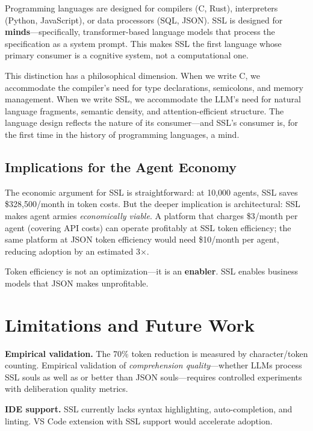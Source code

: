\documentclass[12pt,a4paper]{article}
\theoremstyle{plain}
\theoremstyle{definition}
\theoremstyle{remark}
\begin{document}
Programming languages are designed for compilers (C, Rust), interpreters (Python, JavaScript), or data processors (SQL, JSON). SSL is designed for \textbf{minds}---specifically, transformer-based language models that process the specification as a system prompt. This makes SSL the first language whose primary consumer is a cognitive system, not a computational one.

This distinction has a philosophical dimension. When we write C, we accommodate the compiler's need for type declarations, semicolons, and memory management. When we write SSL, we accommodate the LLM's need for natural language fragments, semantic density, and attention-efficient structure. The language design reflects the nature of its consumer---and SSL's consumer is, for the first time in the history of programming languages, a mind.

\subsection{Implications for the Agent Economy}

The economic argument for SSL is straightforward: at 10,000 agents, SSL saves \$328,500/month in token costs. But the deeper implication is architectural: SSL makes agent armies \emph{economically viable}. A platform that charges \$3/month per agent (covering API costs) can operate profitably at SSL token efficiency; the same platform at JSON token efficiency would need \$10/month per agent, reducing adoption by an estimated 3$\times$.

Token efficiency is not an optimization---it is an \textbf{enabler}. SSL enables business models that JSON makes unprofitable.

\section{Limitations and Future Work}

\textbf{Empirical validation.} The 70\% token reduction is measured by character/token counting. Empirical validation of \emph{comprehension quality}---whether LLMs process SSL souls as well as or better than JSON souls---requires controlled experiments with deliberation quality metrics.

\textbf{IDE support.} SSL currently lacks syntax highlighting, auto-completion, and linting. VS Code extension with SSL support would accelerate adoption.
\end{document}
